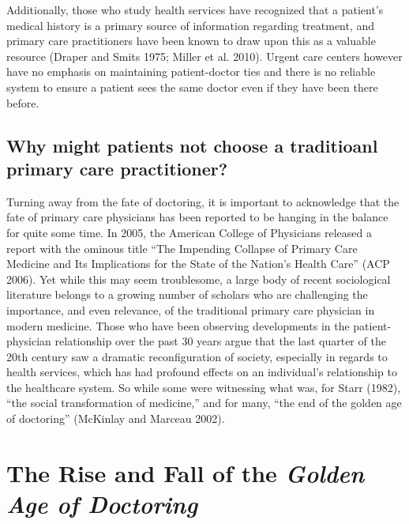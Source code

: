\documentclass[12pt,twoside]{reedthesis}
\begin{document}
  Additionally, those who study health services have recognized that a
  patient's medical history is a primary source of information regarding
  treatment, and primary care practitioners have been known to draw upon
  this as a valuable resource (Draper and Smits 1975; Miller et al. 2010).
  Urgent care centers however have no emphasis on maintaining
  patient-doctor ties and there is no reliable system to ensure a patient
  sees the same doctor even if they have been there before.
  
  \subsection*{Why might patients not choose a traditioanl primary care
  practitioner?}\label{why-might-patients-not-choose-a-traditioanl-primary-care-practitioner}
  
  Turning away from the fate of doctoring, it is important to acknowledge
  that the fate of primary care physicians has been reported to be hanging
  in the balance for quite some time. In 2005, the American College of
  Physicians released a report with the ominous title ``The Impending
  Collapse of Primary Care Medicine and Its Implications for the State of
  the Nation's Health Care'' (ACP 2006). Yet while this may seem
  troublesome, a large body of recent sociological literature belongs to a
  growing number of scholars who are challenging the importance, and even
  relevance, of the traditional primary care physician in modern medicine.
  Those who have been observing developments in the patient-physician
  relationship over the past 30 years argue that the last quarter of the
  20th century saw a dramatic reconfiguration of society, especially in
  regards to health services, which has had profound effects on an
  individual's relationship to the healthcare system. So while some were
  witnessing what was, for Starr (1982), ``the social transformation of
  medicine,'' and for many, ``the end of the golden age of doctoring''
  (McKinlay and Marceau 2002).
  
  \section*{The Rise and Fall of the \emph{Golden Age of
  Doctoring}}\label{the-rise-and-fall-of-the-golden-age-of-doctoring}
  
\end{document}
